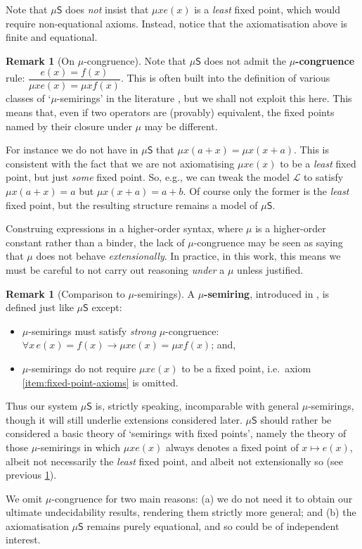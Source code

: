 \documentclass[a4paper,10pt]{amsart}
\newcommand{\defname}[1]{\textbf{{#1}}}
\theoremstyle{definition}
\newtheorem{remark}[theorem]{Remark}
\newcommand{\Lang}{\mathcal L}
\newcommand{\limp}{\rightarrow}
\newcommand{\basicax}{\mu\mathsf{S}}
\begin{document}
Note that $\basicax$ does \emph{not} insist that $\mu x e(x)$ is a \emph{least} fixed point, which would require non-equational axioms. 
Instead, notice that the axiomatisation above is finite and equational.


\begin{remark}
    [On $\mu$-congruence]
    \label{rem:mu-congruence}
    Note that $\basicax$ does not admit the \textbf{$\mu$-congruence} rule: $\dfrac{e(x)=f(x)}{\mu x e(x)=\mu x f(x)}$.
    This is often built into the definition of various classes of `$\mu$-semirings' in the literature \cite{EsikLeiss05,GHK13,Leiss16}, but we shall not exploit this here.
    This means that, even if two operators are (provably) equivalent, the fixed points named by their closure under $\mu$ may be different. 
    
    For instance we do not have in $\basicax$ that $\mu x (a+x) = \mu x (x+a)$.
    This is consistent with the fact that we are not axiomatising $\mu x e(x)$ to be a \emph{least} fixed point, but just \emph{some} fixed point.
    So, e.g., we can tweak the model $\Lang$ to satisfy $\mu x (a+x) =a $ but $\mu x (x+a) = a+b$.
    Of course only the former is the \emph{least} fixed point, but the resulting structure remains a model of $\basicax$.

    Construing expressions in a higher-order syntax, where $\mu$ is a higher-order constant rather than a binder, the lack of $\mu$-congruence may be seen as saying that $\mu$ does not behave \emph{extensionally}.
    In practice, in this work, this means we must be careful to not carry out reasoning \emph{under} a $\mu$ unless justified.
\end{remark}

\begin{remark}
    [Comparison to $\mu$-semirings]
    A \defname{$\mu$-semiring}, introduced in \cite{EsikLeiss05}, is defined just like $\basicax$ except:
    \begin{itemize}
        \item $\mu$-semirings must satisfy \emph{strong} $\mu$-congruence:
        $\forall x\,  e(x) = f(x) \limp \mu x e(x) = \mu x f(x)$; and,
        \item $\mu$-semirings do not require $\mu x e(x) $ to be a fixed point, i.e.\ axiom \eqref{item:fixed-point-axioms} is omitted.
    \end{itemize}
    Thus our system $\basicax$ is, strictly speaking, incomparable with general $\mu$-semirings, though it will still underlie extensions considered later.
     $\basicax$ should rather be considered a basic theory of `semirings with fixed points', namely the theory of those $\mu$-semirings in which $\mu x e(x)$ always denotes a fixed point of $x \mapsto e(x)$, albeit not necessarily the \emph{least} fixed point, and albeit not extensionally so (see previous \cref{rem:mu-congruence}).

% 
     We omit $\mu$-congruence for two main reasons: (a) we do not need it to obtain our ultimate undecidability results, rendering them strictly more general; and (b) the axiomatisation $\basicax$ remains purely equational, and so could be of independent interest.
\end{remark}
\end{document}
